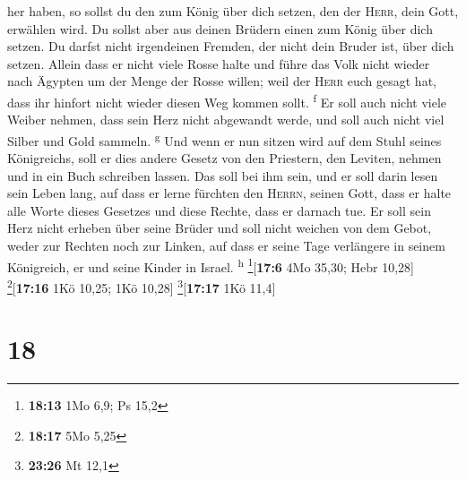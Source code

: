 her haben,  so sollst du den zum König über dich setzen,
den der \textsc{Herr}, dein Gott, erwählen wird. Du sollst aber aus
deinen Brüdern einen zum König über dich setzen. Du darfst nicht
irgendeinen Fremden, der nicht dein Bruder ist, über dich setzen.
 Allein dass er nicht viele Rosse halte und führe das
Volk nicht wieder nach Ägypten um der Menge der Rosse willen; weil der
\textsc{Herr} euch gesagt hat, dass ihr hinfort nicht wieder diesen Weg
kommen sollt. \textsuperscript{f}  Er soll auch nicht
viele Weiber nehmen, dass sein Herz nicht abgewandt werde, und soll auch
nicht viel Silber und Gold sammeln. \textsuperscript{g} 
Und wenn er nun sitzen wird auf dem Stuhl seines Königreichs, soll er
dies andere Gesetz von den Priestern, den Leviten, nehmen und in ein
Buch schreiben lassen.  Das soll bei ihm sein, und er
soll darin lesen sein Leben lang, auf dass er lerne fürchten den
\textsc{Herrn}, seinen Gott, dass er halte alle Worte dieses Gesetzes
und diese Rechte, dass er darnach tue.  Er soll sein Herz
nicht erheben über seine Brüder und soll nicht weichen von dem Gebot,
weder zur Rechten noch zur Linken, auf dass er seine Tage verlängere in
seinem Königreich, er und seine Kinder in Israel. \textsuperscript{h}
\footnote{\textbf{18:13} 1Mo 6,9; Ps 15,2}{[}\textbf{17:6} 4Mo 35,30;
Hebr 10,28{]} \footnote{\textbf{18:17} 5Mo 5,25}{[}\textbf{17:16} 1Kö
10,25; 1Kö 10,28{]} \footnote{\textbf{23:26} Mt 12,1}{[}\textbf{17:17}
1Kö 11,4{]}

\hypertarget{section-17}{%
\section{18}\label{section-17}}

